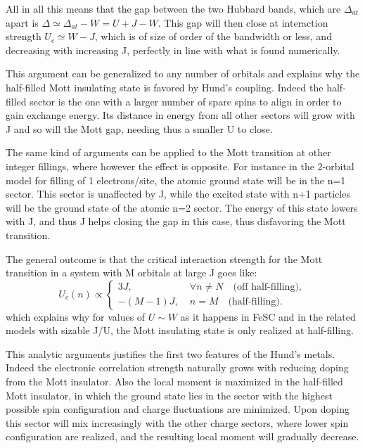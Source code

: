 \documentclass[12pt,twoside]{article}
\def\be{\begin{equation}}
\def\ee{\end{equation}}
\def\D{\Delta}
\begin{document}
All in all this means that the gap between the two Hubbard bands, which are $\D_{at}$ apart is $\D\simeq \D_{at}-W=U+J-W$.
This gap will then close at interaction strength $U_c\simeq W-J$, which is of size of order of the bandwidth or less, and decreasing with increasing J, perfectly in line with what is found numerically\cite{demedici_Vietri}.

This argument can be generalized to any number of orbitals and explains why the half-filled Mott insulating state is favored by Hund's coupling. Indeed the half-filled sector is the one with a larger number of spare spins to align in order to gain exchange energy. Its distance in energy from all other sectors will grow with J and so will the Mott gap, needing thus a smaller U to close.

The same kind of arguments can be applied to the Mott transition at other integer fillings\cite{demedici_MottHund}, where however the effect is opposite. For instance in the 2-orbital model for filling of 1 electrons/site, the atomic ground state will be in the n=1 sector. This sector is unaffected by J, while the excited state with n+1 particles will be the ground state of the atomic n=2 sector. The energy of this state lowers with J, and thus J helps closing the gap in this case, thus disfavoring the Mott transition.

The general outcome\cite{demedici_MottHund} is that the critical interaction strength for the Mott transition in a system with M orbitals at large J goes like:
\be
U_c(n)\propto\begin{cases}
    3J, & \; \forall n\neq N \quad \text{(off half-filling)},\\
    -(M-1)J,  & \; n=M  \quad \text{(half-filling)}.
  \end{cases}\label{eq:D_at_J}
 \ee
which explains why for values of $U\sim W$ as it happens in FeSC and in the related models with sizable J/U, the Mott insulating state is only realized at half-filling.

This analytic arguments justifies the first two features of the Hund's metals. 
Indeed the electronic correlation strength naturally grows with reducing doping from the Mott insulator.
Also the local moment is maximized in the half-filled Mott insulator, in which the ground state lies in the sector with the highest possible spin configuration and charge fluctuations are minimized. Upon doping this sector will mix increasingly with the other charge sectors, where lower spin configuration are realized, and the resulting local moment will gradually decrease.
\end{document}

